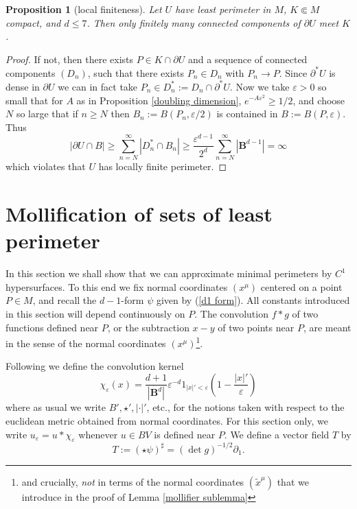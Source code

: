 \documentclass[reqno,12pt,letterpaper]{amsart}
\newcommand{\Ball}{\mathbf{B}}
\newtheorem{proposition}[theorem]{Proposition}
\theoremstyle{definition}
\numberwithin{equation}{section}
\begin{document}
\begin{proposition}[local finiteness]\label{local finiteness}
Let $U$ have least perimeter in $M$, $K \Subset M$ compact, and $d \leq 7$. Then only finitely many connected components of $\partial U$ meet $K$.
\end{proposition}
\begin{proof}
If not, then there exists $P \in K \cap \partial U$ and a sequence of connected components $(D_n)$, such that there exists $P_n \in D_n$ with $P_n \to P$.
Since $\partial^* U$ is dense in $\partial U$ we can in fact take $P_n \in D_n^* := D_n \cap \partial^* U$.
Now we take $\varepsilon > 0$ so small that for $A$ as in Proposition \ref{doubling dimension}, $e^{-A\varepsilon^2} \geq 1/2$, and choose $N$ so large that if $n \geq N$ then $B_n := B(P_n, \varepsilon/2)$ is contained in $B := B(P, \varepsilon)$.
Thus
$$|\partial U \cap B| \geq \sum_{n=N}^\infty |D_n^* \cap B_n| \geq \frac{\varepsilon^{d - 1}}{2^d} \sum_{n=N}^\infty |\Ball^{d - 1}| = \infty$$
which violates that $U$ has locally finite perimeter.
\end{proof}

\section{Mollification of sets of least perimeter}\label{MollifierSection}
In this section we shall show that we can approximate minimal perimeters by $C^1$ hypersurfaces.
To this end we fix normal coordinates $(x^\mu)$ centered on a point $P \in M$, and recall the $d-1$-form $\psi$ given by (\ref{d1 form}).
All constants introduced in this section will depend continuously on $P$.
The convolution $f * g$ of two functions defined near $P$, or the subtraction $x - y$ of two points near $P$, are meant in the sense of the normal coordinates $(x^\mu)$\footnote{and crucially, \emph{not} in terms of the normal coordinates $(\tilde x^\mu)$ that we introduce in the proof of Lemma \ref{mollifier sublemma}}.

Following \cite[Chapter 7]{Giusti77} we define the convolution kernel
$$\chi_\varepsilon(x) = \frac{d + 1}{|\Ball^d|} \varepsilon^{-d}1_{|x|' < \varepsilon} \left(1 - \frac{|x|'}{\varepsilon}\right)$$
where as usual we write $B', \star', |\cdot|'$, etc., for the notions taken with respect to the euclidean metric obtained from normal coordinates.
For this section only, we write $u_\varepsilon = u * \chi_\varepsilon$ whenever $u \in BV$ is defined near $P$.
We define a vector field $T$ by
\begin{equation}\label{T in coords}
T := (\star \psi)^\sharp = (\det g)^{-1/2} \partial_1.
\end{equation}
\end{document}
